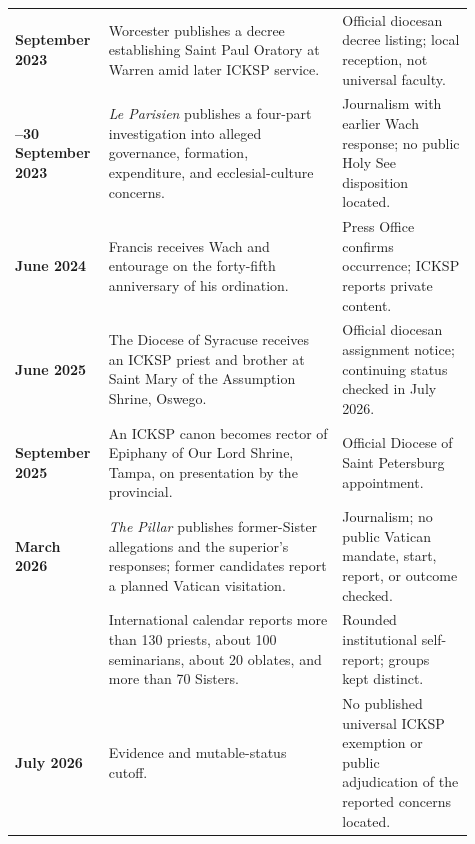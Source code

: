 \begin{longtable}{>{\bfseries\RaggedRight\arraybackslash}p{0.16\linewidth}>{\RaggedRight\arraybackslash}p{0.48\linewidth}>{\RaggedRight\arraybackslash}p{0.27\linewidth}}
14 September 2023 & Worcester publishes a decree establishing Saint Paul Oratory at Warren amid later ICKSP service. & Official diocesan decree listing; local reception, not universal faculty.\\
29--30 September 2023 & \emph{Le Parisien} publishes a four-part investigation into alleged governance, formation, expenditure, and ecclesial-culture concerns. & Journalism with earlier Wach response; no public Holy See disposition located.\\
24 June 2024 & Francis receives Wach and entourage on the forty-fifth anniversary of his ordination. & Press Office confirms occurrence; ICKSP reports private content.\\
June 2025 & The Diocese of Syracuse receives an ICKSP priest and brother at Saint Mary of the Assumption Shrine, Oswego. & Official diocesan assignment notice; continuing status checked in July 2026.\\
1 September 2025 & An ICKSP canon becomes rector of Epiphany of Our Lord Shrine, Tampa, on presentation by the provincial. & Official Diocese of Saint Petersburg appointment.\\
12 March 2026 & \emph{The Pillar} publishes former-Sister allegations and the superior's responses; former candidates report a planned Vatican visitation. & Journalism; no public Vatican mandate, start, report, or outcome checked.\\
2026 & International calendar reports more than 130 priests, about 100 seminarians, about 20 oblates, and more than 70 Sisters. & Rounded institutional self-report; groups kept distinct.\\
17 July 2026 & Evidence and mutable-status cutoff. & No published universal ICKSP exemption or public adjudication of the reported concerns located.\\
\end{longtable}
